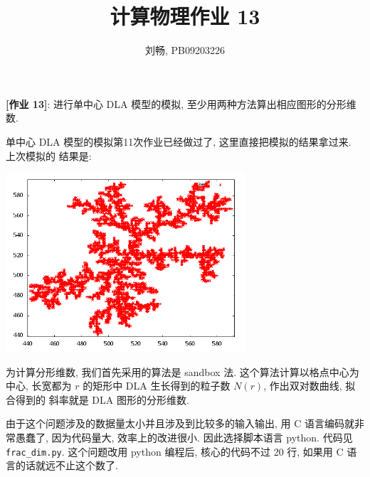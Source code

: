 \documentclass{ctexart}
\begin{document}
\title{计算物理作业 13}
\author{刘畅, PB09203226}
\maketitle

{\bf [作业 13]}: 进行单中心 DLA 模型的模拟, 至少用两种方法算出相应图形的分形维数.

\bigbreak
单中心 DLA 模型的模拟第11次作业已经做过了, 这里直接把模拟的结果拿过来. 上次模拟的
结果是:
\begin{center}
\includegraphics[width=3.5in]{dla.png}
\end{center}

为计算分形维数, 我们首先采用的算法是 sandbox 法. 这个算法计算以格点中心为中心,
长宽都为 $r$ 的矩形中 DLA 生长得到的粒子数 $N(r)$, 作出双对数曲线, 拟合得到的
斜率就是 DLA 图形的分形维数.

由于这个问题涉及的数据量太小并且涉及到比较多的输入输出, 用 C 语言编码就非常愚蠢了,
因为代码量大, 效率上的改进很小. 因此选择脚本语言 python. 代码见 \verb|frac_dim.py|.
这个问题改用 python 编程后, 核心的代码不过 20 行, 如果用 C 语言的话就远不止这个数了.
\end{document}
